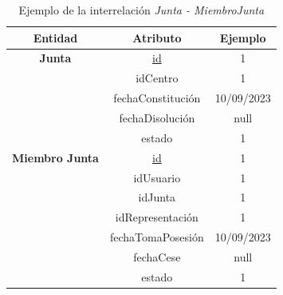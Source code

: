 \begin{itemize}
    \begin{table}[H]
    \centering
        \begin{tabular}{ | c | c | c |  }
             \hline
                 \textbf{Entidad} & \textbf{Atributo} & \textbf{Ejemplo}\\       
             \hline
                 \textbf{Junta}  & \underline{id} & 1\\
                  & idCentro & 1\\
                  & fechaConstitución & 10/09/2023\\
                  & fechaDisolución & null\\
                  & estado & 1\\
              \hline
                 \textbf{Miembro Junta}  & \underline{id} & 1\\
                  & idUsuario & 1\\
                  & idJunta & 1\\
                  & idRepresentación & 1\\
                  & fechaTomaPosesión & 10/09/2023\\
                  & fechaCese & null\\
                  & estado & 1\\
        \end{tabular}
        \caption{Ejemplo de la interrelación \textit{Junta - MiembroJunta}}
        \label{table:I-Ju-MiJu}
    \end{table}
\end{itemize}

